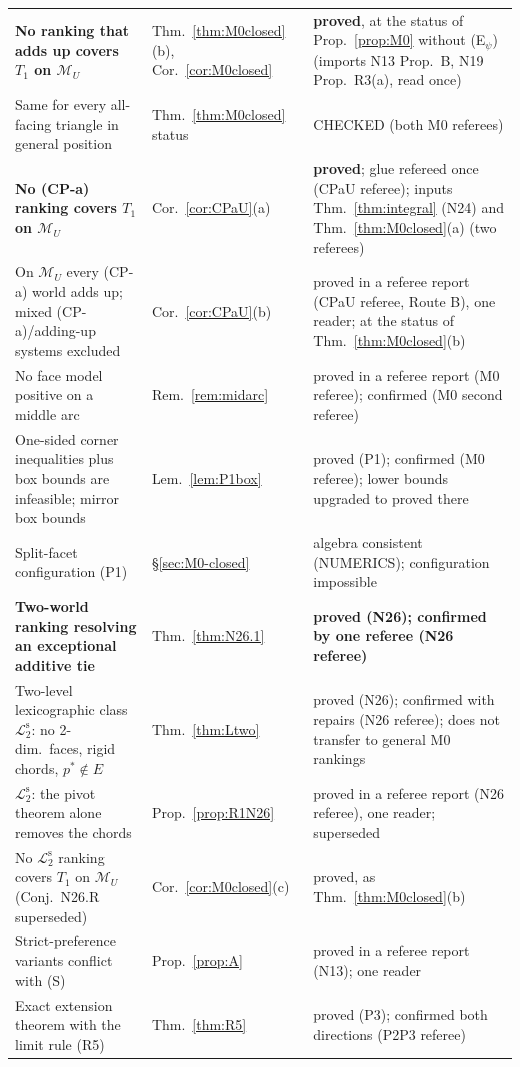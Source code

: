 \documentclass[11pt]{article}
\theoremstyle{definition}
\theoremstyle{remark}
\newcommand{\M}{\mathcal M}
\newcommand{\Ltwo}{\mathcal L_2^{\mathrm s}}
\begin{document}
{\begin{longtable}{>{\raggedright\arraybackslash}p{6.4cm}>{\raggedright\arraybackslash}p{2.1cm}>{\raggedright\arraybackslash}p{5.6cm}}
\textbf{No ranking that adds up covers $T_1$ on $\M_U$} & Thm.~\ref{thm:M0closed}(b), Cor.~\ref{cor:M0closed} & \textbf{proved}, at the status of Prop.~\ref{prop:M0} without (E$_\psi$) (imports N13 Prop.~B, N19 Prop.~R3(a), read once)\\
Same for every all-facing triangle in general position & Thm.~\ref{thm:M0closed} status & CHECKED (both M0 referees)\\
\textbf{No (CP-a) ranking covers $T_1$ on $\M_U$} & Cor.~\ref{cor:CPaU}(a) & \textbf{proved}; glue refereed once (CPaU referee); inputs Thm.~\ref{thm:integral} (N24) and Thm.~\ref{thm:M0closed}(a) (two referees)\\
On $\M_U$ every (CP-a) world adds up; mixed (CP-a)/adding-up systems excluded & Cor.~\ref{cor:CPaU}(b) & proved in a referee report (CPaU referee, Route B), one reader; at the status of Thm.~\ref{thm:M0closed}(b)\\
No face model positive on a middle arc & Rem.~\ref{rem:midarc} & proved in a referee report (M0 referee); confirmed (M0 second referee)\\
One-sided corner inequalities plus box bounds are infeasible; mirror box bounds & Lem.~\ref{lem:P1box} & proved (P1); confirmed (M0 referee); lower bounds upgraded to proved there\\
Split-facet configuration (P1) & \S\ref{sec:M0-closed} & algebra consistent (NUMERICS); configuration impossible\\
\textbf{Two-world ranking resolving an exceptional additive tie} & Thm.~\ref{thm:N26.1} & \textbf{proved (N26); confirmed by one referee (N26 referee)}\\
Two-level lexicographic class $\Ltwo$: no 2-dim.\ faces, rigid chords, $p^*\notin E$ & Thm.~\ref{thm:Ltwo} & proved (N26); confirmed with repairs (N26 referee); does not transfer to general M0 rankings\\
$\Ltwo$: the pivot theorem alone removes the chords & Prop.~\ref{prop:R1N26} & proved in a referee report (N26 referee), one reader; superseded\\
No $\Ltwo$ ranking covers $T_1$ on $\M_U$ (Conj.~N26.R superseded) & Cor.~\ref{cor:M0closed}(c) & proved, as Thm.~\ref{thm:M0closed}(b)\\
Strict-preference variants conflict with (S) & Prop.~\ref{prop:A} & proved in a referee report (N13); one reader\\
Exact extension theorem with the limit rule (R5) & Thm.~\ref{thm:R5} & proved (P3); confirmed both directions (P2P3 referee)\\

\end{longtable}}
\end{document}
